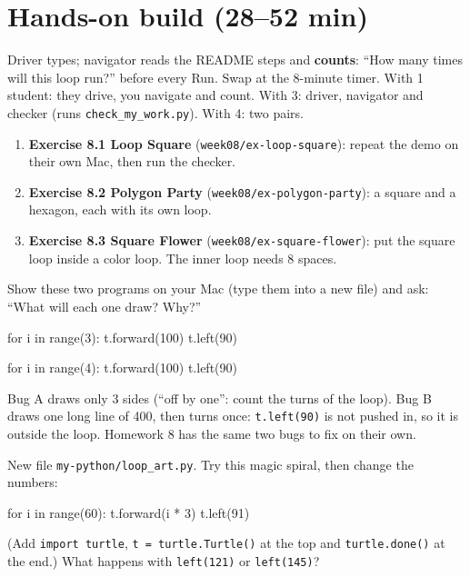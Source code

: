 \section{Hands-on build (28--52 min)}
\begin{pairroles}
Driver types; navigator reads the README steps and \textbf{counts}: \enquote{How many times will this loop run?} before every Run. Swap at the 8-minute timer.
With 1 student: they drive, you navigate and count. With 3: driver, navigator and checker (runs \texttt{check\_my\_work.py}). With 4: two pairs.
\end{pairroles}
\begin{enumerate}[leftmargin=1.4em,itemsep=2pt]
  \item \textbf{Exercise 8.1 Loop Square} (\texttt{week08/ex-loop-square}): repeat the demo on their own Mac, then run the checker.
  \item \textbf{Exercise 8.2 Polygon Party} (\texttt{week08/ex-polygon-party}): a square and a hexagon, each with its own loop.
  \item \textbf{Exercise 8.3 Square Flower} (\texttt{week08/ex-square-flower}): put the square loop inside a color loop. The inner loop needs 8 spaces.
\end{enumerate}
\begin{bughunt}
Show these two programs on your Mac (type them into a new file) and ask: \enquote{What will each one draw? Why?}
\begin{pycode}[Bug A]
for i in range(3):
    t.forward(100)
    t.left(90)
\end{pycode}
\begin{pycode}[Bug B]
for i in range(4):
    t.forward(100)
t.left(90)
\end{pycode}
Bug A draws only 3 sides (\enquote{off by one}: count the turns of the loop). Bug B draws one long line of 400, then turns once: \texttt{t.left(90)} is not pushed in, so it is outside the loop. Homework 8 has the same two bugs to fix on their own.
\end{bughunt}
\begin{freebuild}
New file \texttt{my-python/loop\_art.py}. Try this magic spiral, then change the numbers:
\begin{pycode}
for i in range(60):
    t.forward(i * 3)
    t.left(91)
\end{pycode}
(Add \texttt{import turtle}, \texttt{t = turtle.Turtle()} at the top and \texttt{turtle.done()} at the end.) What happens with \texttt{left(121)} or \texttt{left(145)}?
\end{freebuild}

